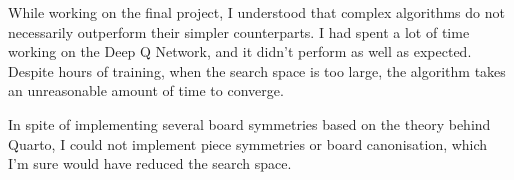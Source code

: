 \documentclass[12pt]{article}
\begin{document}
While working on the final project, I understood that complex algorithms do not necessarily outperform their simpler counterparts. I had spent a lot of time working on the Deep Q Network, and it didn't perform as well as expected. Despite hours of training, when the search space is too large, the algorithm takes an unreasonable amount of time to converge.

In spite of implementing several board symmetries based on the theory behind Quarto, I could not implement piece symmetries or board canonisation, which I'm sure would have reduced the search space.





\newpage
% 
\end{document}
